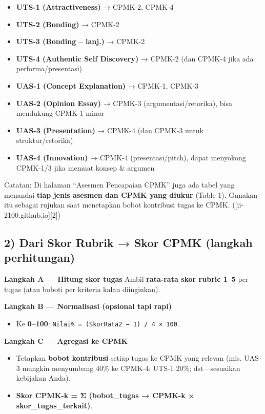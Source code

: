 \documentclass[
  letterpaper,
  DIV=11,
  numbers=noendperiod]{scrreprt}
\providecommand{\tightlist}{%
  \setlength{\itemsep}{0pt}\setlength{\parskip}{0pt}}
\begin{document}
\begin{itemize}
\tightlist
\item
  \textbf{UTS-1 (Attractiveness)} → CPMK-2, CPMK-4
\item
  \textbf{UTS-2 (Bonding)} → CPMK-2
\item
  \textbf{UTS-3 (Bonding -- lanj.)} → CPMK-2
\item
  \textbf{UTS-4 (Authentic Self Discovery)} → CPMK-2 (dan CPMK-4 jika
  ada performa/presentasi)
\item
  \textbf{UAS-1 (Concept Explanation)} → CPMK-1, CPMK-3
\item
  \textbf{UAS-2 (Opinion Essay)} → CPMK-3 (argumentasi/retorika), bisa
  mendukung CPMK-1 minor
\item
  \textbf{UAS-3 (Presentation)} → CPMK-4 (dan CPMK-3 untuk
  struktur/retorika)
\item
  \textbf{UAS-4 (Innovation)} → CPMK-4 (presentasi/pitch), dapat
  menyokong CPMK-1/3 jika memuat konsep \& argumen
\end{itemize}

Catatan: Di halaman ``Asesmen Pencapaian CPMK'' juga ada tabel yang
menandai \textbf{tiap jenis asesmen dan CPMK yang diukur} (Table 1).
Gunakan itu sebagai rujukan saat menetapkan bobot kontribusi tugas ke
CPMK. ({[}ii-2100.github.io{]}{[}2{]})

\subsection*{2) Dari Skor Rubrik → Skor CPMK (langkah
perhitungan)}\label{dari-skor-rubrik-skor-cpmk-langkah-perhitungan}

\textbf{Langkah A --- Hitung skor tugas} Ambil \textbf{rata-rata skor
rubric 1--5} per tugas (atau boboti per kriteria kalau diinginkan).

\textbf{Langkah B --- Normalisasi (opsional tapi rapi)}

\begin{itemize}
\tightlist
\item
  Ke \textbf{0--100}:
  \texttt{Nilai\%\ =\ (SkorRata2\ −\ 1)\ /\ 4\ ×\ 100}.
\end{itemize}

\textbf{Langkah C --- Agregasi ke CPMK}

\begin{itemize}
\tightlist
\item
  Tetapkan \textbf{bobot kontribusi} setiap tugas ke CPMK yang relevan
  (mis. UAS-3 mungkin menyumbang 40\% ke CPMK-4; UTS-1 20\%;
  dst---sesuaikan kebijakan Anda).
\item
  \textbf{Skor CPMK-k = Σ (bobot\_tugas → CPMK-k ×
  skor\_tugas\_terkait)}.
\end{itemize}
\end{document}
